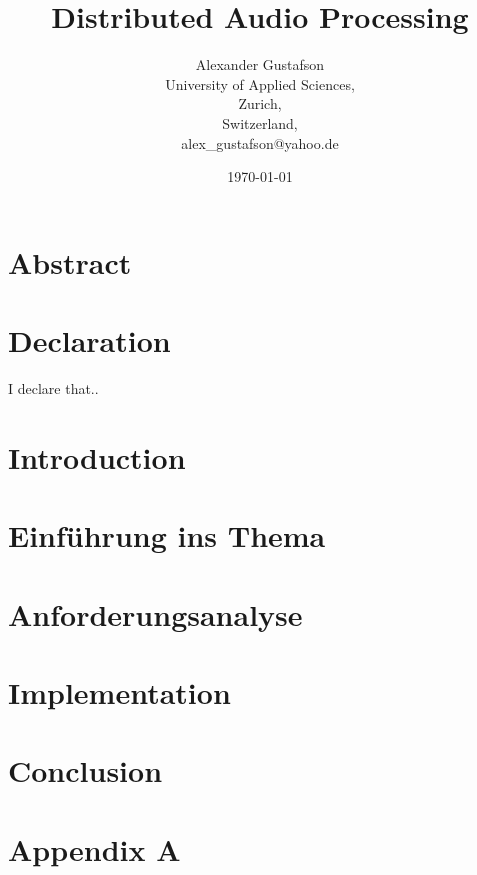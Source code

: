\documentclass{report}
\begin{document}
\title{Distributed Audio Processing}
\author{Alexander Gustafson\\
  University of Applied Sciences,\\
  Zurich,\\
  Switzerland,\\
  alex\_gustafson@yahoo.de}
\date{\today}
\maketitle

\chapter*{Abstract}


\chapter*{Declaration}
I declare that..

\tableofcontents

\chapter{Introduction}



\chapter{Einführung ins Thema}


\chapter{Anforderungsanalyse}


\chapter{Implementation}


\chapter{Conclusion}


{}


\chapter{Appendix A}

\end{document}
